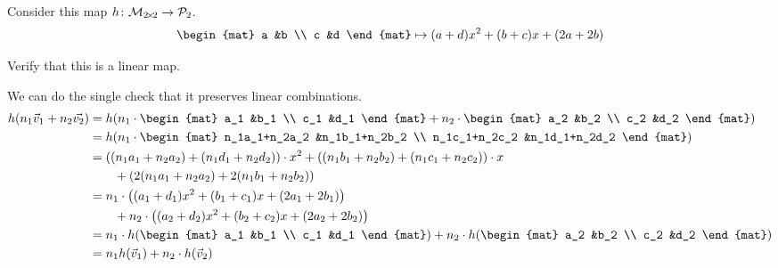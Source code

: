 \documentclass[answers, nolegalese, 11pt]{examjh}
\begin{document}
\thispagestyle{empty}
\vspace{-1ex}

\begin{center}
  \end{center}


\begin{questions}
\question
Consider this map $\mbox{$h\colon \mathcal{M}_{2 \! \times \! 2}\to \mathcal{P}_2$}$.
\begin{equation*}
  \begin{mat}
    a  &b  \\
    c  &d
  \end{mat}
  \mapsto
  (a+d)x^2+(b+c)x+(2a+2b)
\end{equation*}
\begin{parts}
\item
Verify that this is a linear map.
\begin{solution}
We can do the single check that it preserves linear combinations.
\begin{align*}
  h(n_1\vec{v}_1+n_2\vec{v_2})
  &=h(
    n_1\cdot\begin{mat}
      a_1  &b_1  \\
      c_1  &d_1
    \end{mat}
    +
    n_2\cdot\begin{mat}
      a_2  &b_2  \\
      c_2  &d_2
    \end{mat})                        \\
  &=h(
    n_1\cdot\begin{mat}
      n_1a_1+n_2a_2  &n_1b_1+n_2b_2  \\
      n_1c_1+n_2c_2  &n_1d_1+n_2d_2
    \end{mat})                         \\
  &=((n_1a_1+n_2a_2)+(n_1d_1+n_2d_2))\cdot x^2          
   +((n_1b_1+n_2b_2)+(n_1c_1+n_2c_2))\cdot x    \\
  &\qquad  +(2(n_1a_1+n_2a_2)+2(n_1b_1+n_2b_2))      \\
  &=n_1\cdot\bigl((a_1+d_1)x^2+(b_1+c_1)x+(2a_1+2b_1)\bigr)    \\
  &\qquad +n_2\cdot\bigl((a_2+d_2)x^2+(b_2+c_2)x+(2a_2+2b_2)\bigr)   \\
  &=n_1\cdot h(\begin{mat}
      a_1  &b_1  \\
      c_1  &d_1
    \end{mat})
    +
    n_2\cdot h(\begin{mat}
      a_2  &b_2  \\
      c_2  &d_2
    \end{mat})                           \\
  &=n_1h(\vec{v}_1)+n_2\cdot h(\vec{v}_2)
\end{align*}


\end{solution}
\end{parts}
\end{questions}
\end{document}
